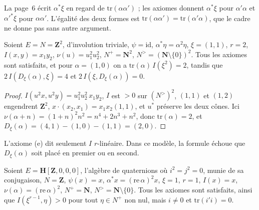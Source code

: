 \begin{remarque}
La page~6 écrit $\alpha^*\xi$ en regard de $\mathrm{tr}(\alpha\alpha')$ ; les axiomes donnent $\alpha^*\xi$ pour $\alpha'\alpha$ et $\alpha'^*\xi$ pour $\alpha\alpha'$. L'égalité des deux formes est $\mathrm{tr}(\alpha\alpha') = \mathrm{tr}(\alpha'\alpha)$, que le cadre ne donne pas sans autre argument.
\end{remarque}

\begin{encadre}
\begin{contrexemple}
Soient $E = N = \mathbf Z^2$, d'involution triviale, $\psi = \mathrm{id}$, $\alpha^*\eta = \alpha^2\eta$, $\xi = (1, 1)$, $r = 2$, $I(x, y) = x_1y_2$, $\nu(u) = u_1^2u_2^2$, $N^+ = \mathbf N^2$, $N^> = (\mathbf N \setminus \{0\})^2$. Tous les axiomes sont satisfaits, et pour $\alpha = (1, 0)$ on a $\mathrm{tr}(\alpha)\, I(\xi^2) = 2$, tandis que $2\, I(D_\xi(\alpha), \xi) = 4$ et $2\, I(\xi, D_\xi(\alpha)) = 0$.
\end{contrexemple}
\end{encadre}

\begin{proof}
$I(u^2x, u^2y) = u_1^2u_2^2\, x_1y_2$, $I$ est $> 0$ sur $(N^>)^2$, $(1, 1)$ et $(1, 2)$ engendrent $\mathbf Z^2$, $x\cdot(x_2, x_1) = x_1x_2(1, 1)$, et $u^*$ préserve les deux cônes. Ici $\nu(\alpha + n) = (1 + n)^2n^2 = n^4 + 2n^3 + n^2$, donc $\mathrm{tr}(\alpha) = 2$, et $D_\xi(\alpha) = (4, 1) - (1, 0) - (1, 1) = (2, 0)$.
\end{proof}

\noindent L'axiome (e) dit seulement $I$ $r$-linéaire. Dans ce modèle, la formule échoue que $D_\xi(\alpha)$ soit placé en premier ou en second.

\begin{encadre}
\begin{contrexemple}
Soient $E = \mathbf H[\mathbf Z, 0, 0, 0]$, l'algèbre de quaternions où $i^2 = j^2 = 0$, munie de sa conjugaison, $N = \mathbf Z$, $\psi(x) = x$, $\alpha^*x = (\mathrm{re}\,\alpha)^2x$, $\xi = 1$, $r = 1$, $I(x) = x$, $\nu(\alpha) = (\mathrm{re}\,\alpha)^2$, $N^+ = \mathbf N$, $N^> = \mathbf N \setminus \{0\}$. Tous les axiomes sont satisfaits, ainsi que $I(\xi^{r-1}, \eta) > 0$ pour tout $\eta \in N^+$ non nul, mais $i \neq 0$ et $\mathrm{tr}(i'i) = 0$.
\end{contrexemple}
\end{encadre}

